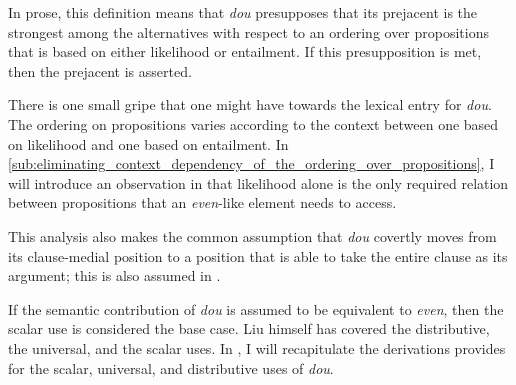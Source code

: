 \documentclass[12pt]{article}
\DeclareMathOperator{\xh}{\textsc{Exh}}
\newcommand{\exh}{\ensuremath{\xh}}
\begin{document}
In prose, this definition means that \emph{dou} presupposes that its prejacent is the strongest among the alternatives with respect to an ordering over propositions that is based on either likelihood or entailment.  
If this presupposition is met, then the prejacent is asserted.

There is one small gripe that one might have towards the lexical entry for \emph{dou}.
The ordering on propositions varies according to the context between one based on likelihood and one based on entailment.
In \cref{sub:eliminating_context_dependency_of_the_ordering_over_propositions}, I will introduce an observation in \citet{crnicNonmonotonicityNPILicensing2014} that likelihood alone is the only required relation between propositions that an \emph{even}-like element needs to access.

This analysis also makes the common assumption that \emph{dou} covertly moves from its clause-medial position to a position that is able to take the entire clause as its argument; this is also assumed in \citet{crnicNonmonotonicityNPILicensing2014}.

If the semantic contribution of \emph{dou} is assumed to be equivalent to \emph{even}, then the scalar use is considered the base case.
Liu himself has covered the distributive, the universal, and the scalar uses.
In , I will recapitulate the derivations \citet{liuVarietiesAlternativesMandarin2017,liuPragmaticExplanationMeidou2021} provides for the scalar, universal, and distributive uses of \emph{dou}.
\end{document}
